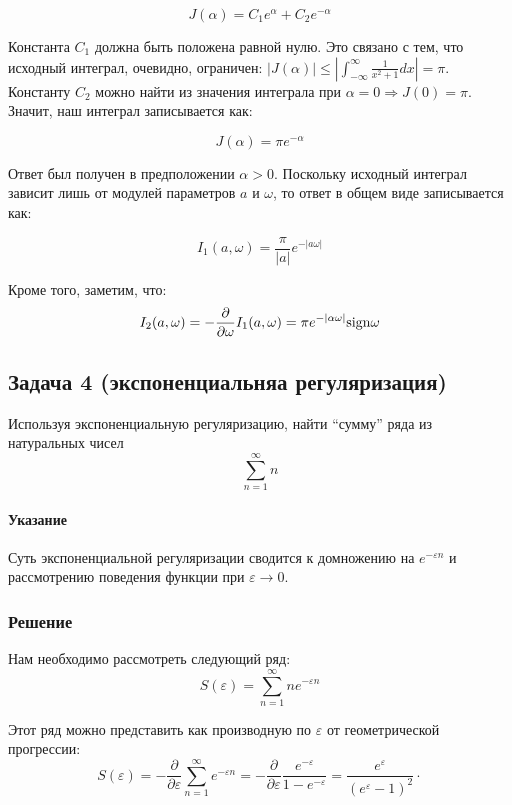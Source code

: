 \documentclass[a4paper,12pt]{article}
\begin{document}
\[
J(\alpha)=C_{1}e^{\alpha}+C_{2}e^{-\alpha}
\]

\noindent
Константа $C_{1}$ должна быть положена равной нулю. Это связано с
тем, что исходный интеграл, очевидно, ограничен: $\left|J\left(\alpha\right)\right|\leq\left|\int_{-\infty}^{\infty}\frac{1}{x^{2}+1}dx\right|=\pi$.
Константу $C_{2}$ можно найти из значения интеграла при $\alpha=0\Rightarrow J(0)=\pi$.
Значит, наш интеграл записывается как:

\[
J(\alpha)=\pi e^{-\alpha}
\]

\noindent
Ответ был получен в предположении $\alpha>0$. Поскольку исходный
интеграл зависит лишь от модулей параметров $a$ и $\omega$, то ответ
в общем виде записывается как:

\[
I_{1}(a,\omega)=\frac{\pi}{\left|a\right|}e^{-\left|a\omega\right|}
\]

\noindent
Кроме того, заметим, что:
\[
I_{2}(a,\omega)=-\frac{\partial}{\partial\omega}I_{1}(a,\omega)=\pi e^{-\left|\alpha\omega\right|}{\rm sign}\omega
\]



\subsection*{Задача 4 (экспоненциальняа регуляризация)}

Используя экспоненциальную регуляризацию, найти ``сумму'' ряда из
натуральных чисел 
\[
\sum_{n=1}^{\infty}n
\]



\paragraph{Указание}

Суть экспоненциальной регуляризации сводится к домножению на $e^{-\varepsilon n}$
и рассмотрению поведения функции при $\varepsilon\to0$.


\subsubsection*{Решение}

Нам необходимо рассмотреть следующий ряд:
\[
S(\varepsilon)=\sum_{n=1}^{\infty}ne^{-\varepsilon n}
\]

\noindent
Этот ряд можно представить как производную по $\varepsilon$ от геометрической
прогрессии:
\[
S(\varepsilon)=-\frac{\partial}{\partial\varepsilon}\sum_{n=1}^{\infty}e^{-\varepsilon n}=-\frac{\partial}{\partial\varepsilon}\frac{e^{-\varepsilon}}{1-e^{-\varepsilon}}=\frac{e^{\varepsilon}}{(e^{\varepsilon}-1)^{2}}\cdot
\]
\end{document}
